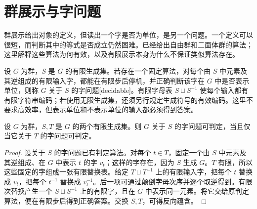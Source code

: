 
\section{群展示与字问题}
\label{b1:sec:C03}

群展示给出对象的定义，但读出一个字是否为单位，是另一个问题。一个定义可以很短，而判断其中的等式是否成立仍然困难。已经给出自由群和二面体群的算法；这里解释这些算法为何有效，以及有限展示本身为什么不保证类似算法存在。

\begin{samepage}
	\begin{definition}\label{b1:def:C-decidable-word-problem}
		设 \(G\) 为群，\(S\) 是 \(G\) 的有限生成集。若存在一个固定算法，对每个由 \(S\) 中元素及其逆组成的有限输入字，都能在有限步后停机，并正确判断该字在 \(G\) 中是否表示单位，则称 \(G\) 关于 \(S\) 的字问题[decidable]。有限字母表 \(S\sqcup S^{-1}\) 使每个输入都有有限字符串编码；若使用无限生成集，还须另行规定生成符号的有效编码。这里不要求高效率，但表示单位和不表示单位的输入都必须得到答案。
	\end{definition}
\end{samepage}

\begin{proposition}\label{b1:prop:C-word-problem-generators}
	设 \(G\) 为群，\(S,T\) 是 \(G\) 的两个有限生成集。则 \(G\) 关于 \(S\) 的字问题可判定，当且仅当它关于 \(T\) 的字问题可判定。
\end{proposition}

\begin{proof}
	设关于 \(S\) 的字问题已有判定算法。对每个 \(t\in T\)，固定一个由 \(S\) 中元素及其逆组成、在 \(G\) 中表示 \(t\) 的字 \(v_t\)；这样的字存在，因为 \(S\) 生成 \(G\)。\(T\) 有限，所以这些固定的字组成一张有限替换表。给定 \(T\sqcup T^{-1}\) 上的有限输入字，把每个 \(t\) 替换成 \(v_t\)，把每个 \(t^{-1}\) 替换成 \(v_t^{-1}\)。后一项可通过颠倒字母次序并逐个取逆得到。有限次替换产生一个 \(S\sqcup S^{-1}\) 上的有限字，且在 \(G\) 中表示同一元素。将它交给原判定算法，便在有限步后得到正确答案。交换 \(S,T\)，可得反向蕴含。
\end{proof}

